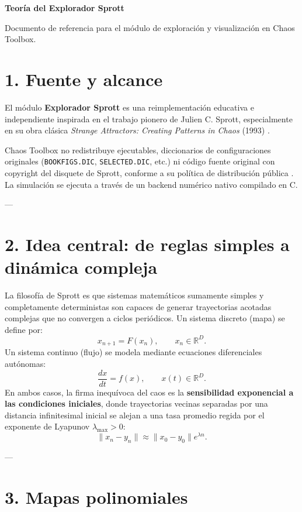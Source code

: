 \documentclass[11pt]{article}
\newcommand{\code}[1]{\texttt{#1}}
\begin{document}
{\LARGE\bfseries Teoría del Explorador Sprott}\par
{\small Documento de referencia para el módulo de exploración y visualización en Chaos Toolbox.}\par
\vspace{0.8em}

\tableofcontents
\newpage

\section{1. Fuente y alcance}

El módulo \textbf{Explorador Sprott} es una reimplementación educativa e independiente inspirada en el trabajo pionero de Julien C. Sprott, especialmente en su obra clásica \emph{Strange Attractors: Creating Patterns in Chaos} (1993) \cite{sprott1993book}. 

Chaos Toolbox no redistribuye ejecutables, diccionarios de configuraciones originales (\code{BOOKFIGS.DIC}, \code{SELECTED.DIC}, etc.) ni código fuente original con copyright del disquete de Sprott, conforme a su política de distribución pública \cite{docsrelease}. La simulación se ejecuta a través de un backend numérico nativo compilado en C.

---

\section{2. Idea central: de reglas simples a dinámica compleja}

La filosofía de Sprott es que sistemas matemáticos sumamente simples y completamente deterministas son capaces de generar trayectorias acotadas complejas que no convergen a ciclos periódicos. Un sistema discreto (mapa) se define por:
\[
x_{n+1} = F(x_n), \qquad x_n \in \mathbb{R}^D.
\]
Un sistema continuo (flujo) se modela mediante ecuaciones diferenciales autónomas:
\[
\frac{dx}{dt} = f(x), \qquad x(t) \in \mathbb{R}^D.
\]
En ambos casos, la firma inequívoca del caos es la \textbf{sensibilidad exponencial a las condiciones iniciales}, donde trayectorias vecinas separadas por una distancia infinitesimal inicial se alejan a una tasa promedio regida por el exponente de Lyapunov $\lambda_{\max} > 0$:
\[
\|x_n - y_n\| \approx \|x_0 - y_0\| e^{\lambda n}.
\]

---

\section{3. Mapas polinomiales}
\end{document}
